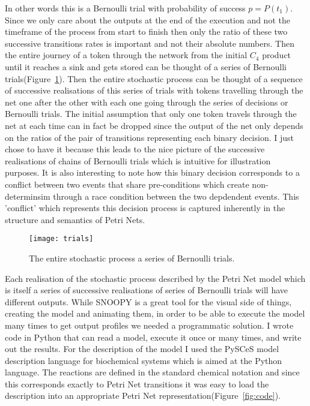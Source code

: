 In other words this is a Bernoulli trial with probability of success
$p = P(t_1)$. Since we only care about the outputs at the end of the
execution and not the timeframe of the process from start to finish
then only the ratio of these two successive transitions rates is
important and not their absolute numbers. Then the entire journey of a token through the network
from the initial $C_4$ product until it reaches a sink and gets stored
can be thought of a series of Bernoulli
trials(Figure~\ref{fig:trials}). Then the entire stochastic process
can be thought of a sequence of successive realisations of this series
of trials with tokens travelling through the net one
after the other with each one going through the series of decisions
or Bernoulli trials. The initial assumption that only one token
travels through the net at each time can in fact be dropped since the
output of the net only depends on the ratios of the pair of
transitions representing each binary decision. I just chose to have it
because this leads to the nice picture of the successive realisations
of chains of Bernoulli trials which is intuitive for illustration
purposes.
It is also interesting to note how this binary decision
corresponds to a conflict between two events that share pre-conditions
which create non-determinsim through a race condition between the two
depdendent events. This 'conflict' which represents this decision
process is captured inherently in the structure and semantics of Petri
Nets.

\begin{figure}[htbp!]
\centering
\texttt{[image: trials]}
\caption[Stochastic proces as a series of Bernoulli trials]{The entire
stochastic process a series of Bernoulli trials.}
\label{fig:trials}
\end{figure}

Each realisation of the stochastic process described by the Petri Net
model which is itself a series of successive realisations of series of
Bernoulli trials will have different outputs. While SNOOPY is a great
tool for the visual side of things, creating the model and animating
them, in order to be able to execute the model many times to get
output profiles we needed a programmatic solution. I wrote code in
Python that can read a model, execute it once or many times, and write
out the results. For the description of the model I used the PySCeS
model description language for biochemical systems which is aimed at
the Python language. The reactions are
defined in the standard chemical notation and since this corresponds
exactly to Petri Net transitions it was easy to load the description
into an appropriate Petri Net representation(Figure~\ref{fig:code}).

